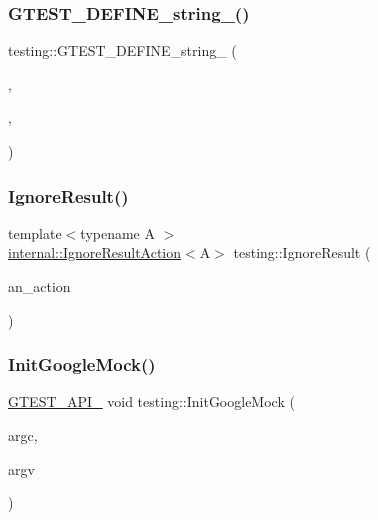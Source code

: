 \subsubsection{\texorpdfstring{GTEST\_DEFINE\_string\_()}{GTEST\_DEFINE\_string\_()}\hspace{0.1cm}{\footnotesize\ttfamily [5/5]}}
{\footnotesize\ttfamily testing\+::\+G\+T\+E\+S\+T\+\_\+\+D\+E\+F\+I\+N\+E\+\_\+string\+\_\+ (\begin{DoxyParamCaption}\item[{stream\+\_\+result\+\_\+to}]{,  }\item[{\mbox{\hyperlink{namespacetesting_1_1internal_a7ed785df46a339403b0f749d3a879201}{internal\+::\+String\+From\+G\+Test\+Env}}(\char`\"{}stream\+\_\+result\+\_\+to\char`\"{}, \char`\"{}\char`\"{})}]{,  }\item[{\char`\"{}This flag specifies the host name and the port number on which to stream \char`\"{} \char`\"{}test results. Example\+: \textbackslash{}\char`\"{}localhost\+:555\textbackslash{}\char`\"{}. The flag is effective only on \char`\"{} \char`\"{}Linux.\char`\"{}}]{ }\end{DoxyParamCaption})}

\mbox{\label{namespacetesting_a50ae42540a31047c7fddd32df8d835f5}} 
\subsubsection{\texorpdfstring{IgnoreResult()}{IgnoreResult()}}
{\footnotesize\ttfamily template$<$typename A $>$ \\
\mbox{\hyperlink{classtesting_1_1internal_1_1IgnoreResultAction}{internal\+::\+Ignore\+Result\+Action}}$<$A$>$ testing\+::\+Ignore\+Result (\begin{DoxyParamCaption}\item[{const A \&}]{an\+\_\+action }\end{DoxyParamCaption})\hspace{0.3cm}{\ttfamily [inline]}}

\mbox{\label{namespacetesting_a32b1c6db9ba5133ccabfa67616b3c041}} 
\subsubsection{\texorpdfstring{InitGoogleMock()}{InitGoogleMock()}\hspace{0.1cm}{\footnotesize\ttfamily [1/2]}}
{\footnotesize\ttfamily \mbox{\hyperlink{gtest-port_8h_aa73be6f0ba4a7456180a94904ce17790}{G\+T\+E\+S\+T\+\_\+\+A\+P\+I\+\_\+}} void testing\+::\+Init\+Google\+Mock (\begin{DoxyParamCaption}\item[{int $\ast$}]{argc,  }\item[{char $\ast$$\ast$}]{argv }\end{DoxyParamCaption})}


